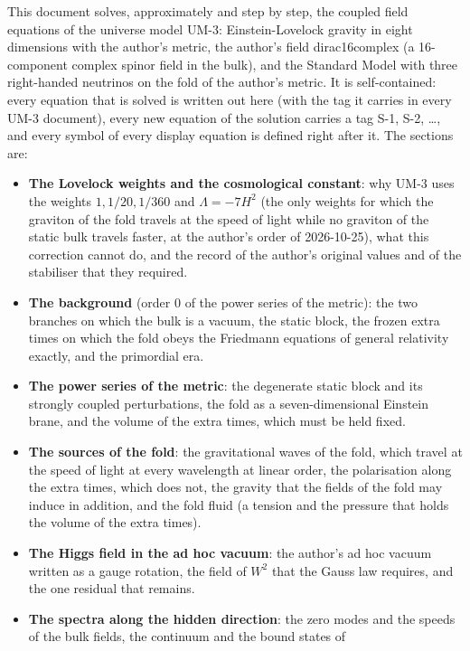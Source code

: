 \documentclass[
  10pt,
]{article}
\providecommand{\tightlist}{%
  \setlength{\itemsep}{0pt}\setlength{\parskip}{0pt}}
\begin{document}
This document solves, approximately and step by step, the coupled field
equations of the universe model UM-3: Einstein-Lovelock gravity in eight
dimensions with the author's metric, the author's field dirac16complex
(a 16-component complex spinor field in the bulk), and the Standard
Model with three right-handed neutrinos on the fold of the author's
metric. It is self-contained: every equation that is solved is written
out here (with the tag it carries in every UM-3 document), every new
equation of the solution carries a tag S-1, S-2, \ldots, and every
symbol of every display equation is defined right after it. The sections
are:

\begin{itemize}
\tightlist
\item
  \textbf{The Lovelock weights and the cosmological constant}: why UM-3
  uses the weights \(1, 1/20, 1/360\) and \(\Lambda = -7H^2\) (the only
  weights for which the graviton of the fold travels at the speed of
  light while no graviton of the static bulk travels faster, at the
  author's order of 2026-10-25), what this correction cannot do, and the
  record of the author's original values and of the stabiliser that they
  required.
\item
  \textbf{The background} (order 0 of the power series of the metric):
  the two branches on which the bulk is a vacuum, the static block, the
  frozen extra times on which the fold obeys the Friedmann equations of
  general relativity exactly, and the primordial era.
\item
  \textbf{The power series of the metric}: the degenerate static block
  and its strongly coupled perturbations, the fold as a
  seven-dimensional Einstein brane, and the volume of the extra times,
  which must be held fixed.
\item
  \textbf{The sources of the fold}: the gravitational waves of the fold,
  which travel at the speed of light at every wavelength at linear
  order, the polarisation along the extra times, which does not, the
  gravity that the fields of the fold may induce in addition, and the
  fold fluid (a tension and the pressure that holds the volume of the
  extra times).
\item
  \textbf{The Higgs field in the ad hoc vacuum}: the author's ad hoc
  vacuum written as a gauge rotation, the field of \(W^2\) that the
  Gauss law requires, and the one residual that remains.
\item
  \textbf{The spectra along the hidden direction}: the zero modes and
  the speeds of the bulk fields, the continuum and the bound states of

\end{itemize}
\end{document}

